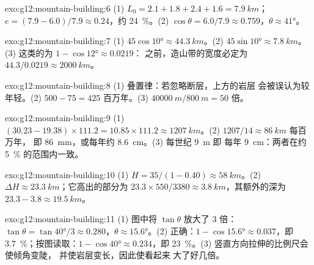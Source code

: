 \begin{solution}{exo:g12:mountain-building:6}
(1) $L_0 = 2.1 + 1.8 + 2.4 + 1.6 = \qty{7.9}{km}$；
$e = (7.9 - 6.0)/7.9 \approx 0.24$，约 \qty{24}{\percent}。(2) $\cos\theta =
6.0/7.9 \approx 0.759$，$\theta \approx \ang{41}$。
\end{solution}

\begin{solution}{exo:g12:mountain-building:7}
(1) $45\cos\ang{10} \approx \qty{44.3}{km}$。(2) $45\sin\ang{10} \approx
\qty{7.8}{km}$。(3) 这类的为 $1 - \cos\ang{12} \approx 0.0219$：
之前，造山带的宽度必定为
$44.3/0.0219 \approx \qty{2000}{km}$。
\end{solution}

\begin{solution}{exo:g12:mountain-building:8}
(1) 叠置律：若忽略断层，上方的岩层
会被误认为较年轻。(2) $500 - 75 = 425$ 百万年。(3) $\qty{40000}{m} /
\qty{800}{m} = 50$ 倍。
\end{solution}

\begin{solution}{exo:g12:mountain-building:9}
(1) $(30.23 - 19.38) \times 111.2 = 10.85 \times 111.2 \approx
\qty{1207}{km}$。(2) $1207/14 \approx \qty{86}{km}$ 每百万年，
即 \qty{86}{mm}，或每年约 \qty{8.6}{cm}。(3) 每世纪 \qty{9}{m} 即
每年 \qty{9}{cm}：两者在约 \qty{5}{\percent} 的范围内一致。
\end{solution}

\begin{solution}{exo:g12:mountain-building:10}
(1) $H = 35/(1 - 0.40) \approx \qty{58}{km}$。(2) $\Delta H \approx
\qty{23.3}{km}$；它高出的部分为 $23.3 \times 550/3380 \approx
\qty{3.8}{km}$，其额外的深为 $23.3 - 3.8 \approx \qty{19.5}{km}$。
\end{solution}

\begin{solution}{exo:g12:mountain-building:11}
(1) 图中将 $\tan\theta$ 放大了 3 倍：$\tan\theta = \tan\ang{40}/3
\approx 0.280$，$\theta \approx \ang{15.6}$。(2) 正确：$1 - \cos\ang{15.6}
\approx 0.037$，即 \qty{3.7}{\percent}；按图读取：$1 - \cos\ang{40}
\approx 0.234$，即 \qty{23}{\percent}。(3) 竖直方向拉伸的比例尺会使倾角变陡，
并使岩层变长，因此使看起来
大了好几倍。
\end{solution}

